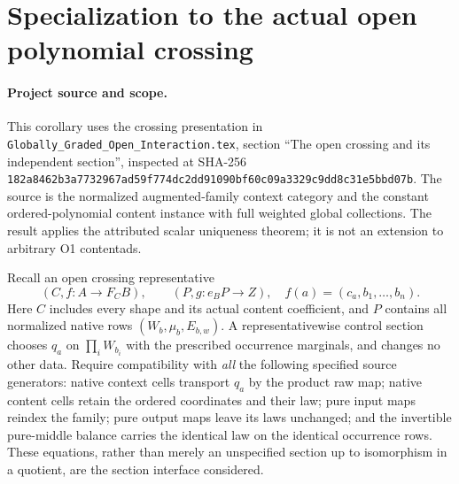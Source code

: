 \documentclass{article}
\begin{document}
\section{Specialization to the actual open polynomial crossing}
\paragraph{Project source and scope.}
This corollary uses the crossing presentation in
\texttt{Globally\_Graded\_Open\_Interaction.tex}, section ``The open crossing
and its independent section'', inspected at SHA-256
\texttt{182a8462b3a7732967ad59f774dc2dd91090bf60c09a3329c9dd8c31e5bbd07b}.
The source is the normalized augmented-family context category and the
constant ordered-polynomial content instance with full weighted global
collections. The result applies the attributed scalar uniqueness theorem;
it is not an extension to arbitrary O1 contentads.

Recall an open crossing representative
\[
 (C,f:A\to F_CB),\qquad (P,g:e_BP\to Z),
 \quad f(a)=(c_a,b_1,\ldots,b_n).
\]
Here $C$ includes every shape and its actual content coefficient, and $P$
contains all normalized native rows $(W_b,\mu_b,E_{b,w})$.
A representativewise control section chooses $q_a$ on
$\prod_iW_{b_i}$ with the prescribed occurrence marginals, and changes
no other data. Require compatibility with \emph{all} the following specified
source generators: native context cells transport $q_a$ by the product raw
map; native content cells retain the ordered coordinates and their law;
pure input maps reindex the family; pure output maps leave its laws unchanged;
and the invertible pure-middle balance carries the identical law on the
identical occurrence rows. These equations, rather than merely an unspecified
section up to isomorphism in a quotient, are the section interface considered.
\end{document}
